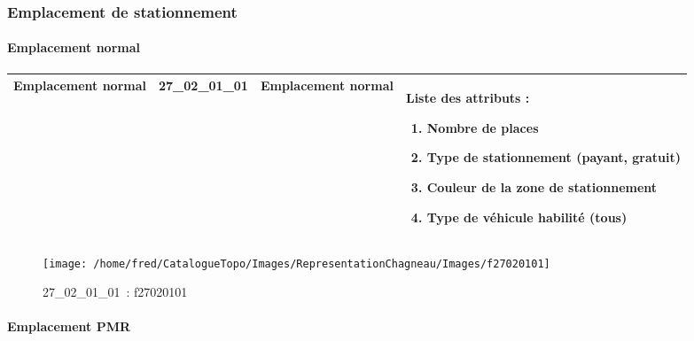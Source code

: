 \documentclass[12pt,titlepage]{book}
\begin{document}
\subsubsection{\large Emplacement de stationnement}
\paragraph{Emplacement normal}
\noindent
\vspace{\baselineskip}

\renewcommand{\arraystretch}{1.2}
\begin{supertabular}{|p{10cm}|c|p{13cm}|p{12cm}|}
 Emplacement normal & 27\_02\_01\_01 & Emplacement normal & Liste des attributs :
\begin{enumerate}
  \item Nombre de places  \item Type de stationnement (payant, gratuit)  \item Couleur de la zone de stationnement  \item Type de véhicule habilité (tous)\end{enumerate}
\\
\hline
\end{supertabular}
\begin{figure}[h!]
  \hfill         %
  \begin{minipage}[t]{3cm}
    \begin{center}
      \texttt{[image: /home/fred/CatalogueTopo/Images/RepresentationChagneau/Images/f27020101]}
      \caption[~27\_02\_01\_01]{\small{27\_02\_01\_01~:} \tiny{f27020101}}\label{f27020101}
    \end{center}
  \end{minipage}
\end{figure}


\paragraph{Emplacement PMR}
\noindent
\vspace{\baselineskip}
\end{document}
